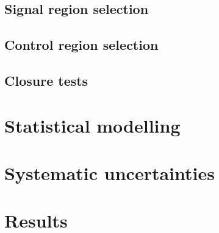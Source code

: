 

\subsection{Signal region selection \label{sec:boost_signal_selection}}



\subsection{Control region selection \label{sec:boost_control_selection}}



\subsection{Closure tests \label{sec:boost_closure_tests}}




\section{Statistical modelling \label{sec:boost_likelihood}}





\section{Systematic uncertainties \label{sec:boost_systematics}}





\section{Results \label{sec:boost_results}}

